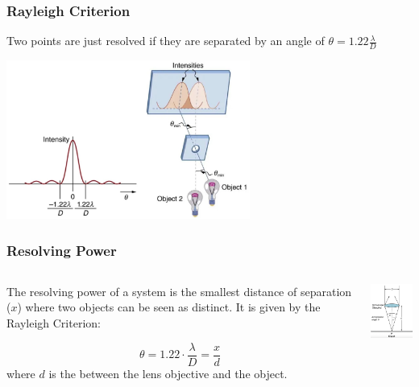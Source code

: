 \documentclass{beamer}
\begin{document}
\begin{frame}\frametitle{Rayleigh Criterion}


Two points are just resolved if they are separated by an angle of $\theta = 1.22 \frac{\lambda}{D}$

\vspace{0.25cm}

\begin{center}
\includegraphics[width=8cm]{fig/rayleigh2.jpg}
\end{center}
\end{frame}

\begin{frame}\frametitle{Resolving Power}
\begin{columns}
\begin{column}{7cm}
The resolving power of a system is the smallest distance of separation ($x$) where two objects can be seen as distinct. It is given by the Rayleigh Criterion:

\[\theta = 1.22 \cdot \frac{\lambda}{D} = \frac{x}{d}\]
where $d$ is the between the lens objective and the object.

\end{column}
\begin{column}{4cm}
\begin{center}
\includegraphics[width=3cm]{fig/rayleigh3.jpg}
\end{center}
\end{column}
\end{columns}
\end{frame}
\end{document}
